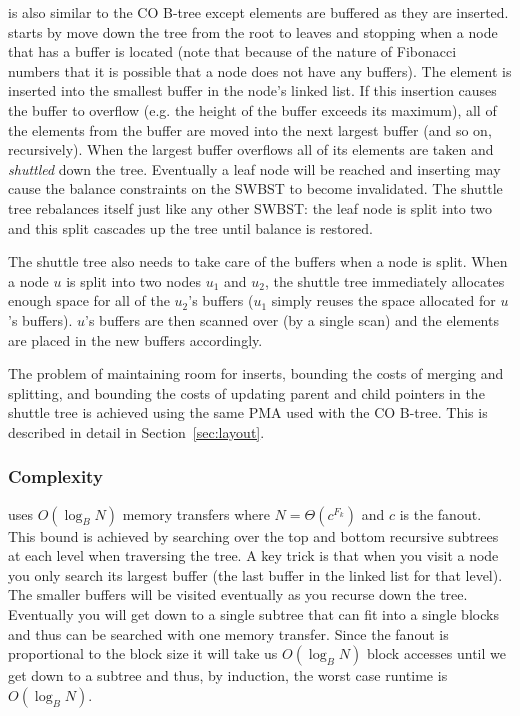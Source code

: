 \documentclass[preprint]{style}
\begin{document}
\Insert{} is also similar to the CO B-tree except elements are buffered as they
are inserted. \Insert{} starts by move down the tree from the root to leaves
and stopping when a node that has a buffer is located (note that because of the
nature of Fibonacci numbers that it is possible that a node does not have any
buffers). The element is inserted into the smallest buffer in the node's linked
list. If this insertion causes the buffer to overflow (e.g. the height of the
buffer exceeds its maximum), all of the elements from the buffer are moved into
the next largest buffer (and so on, recursively).  When the largest buffer
overflows all of its elements are taken and \textit{shuttled} down the tree.
Eventually a leaf node will be reached and inserting may cause the balance
constraints on the SWBST to become invalidated. The shuttle tree rebalances
itself just like any other SWBST: the leaf node is split into two and this
split cascades up the tree until balance is restored.

The shuttle tree also needs to take care of the buffers when a node is split.
When a node $u$ is split into two nodes $u_1$ and $u_2$, the shuttle tree
immediately allocates enough space for all of the $u_2$'s buffers ($u_1$ simply
reuses the space allocated for $u$'s buffers). $u$'s buffers are then scanned
over (by a single scan) and the elements are placed in the new buffers
accordingly.

The problem of maintaining room for inserts, bounding the costs of
merging and splitting, and bounding the costs of updating parent and child
pointers in the shuttle tree is achieved using the same PMA used with the CO
B-tree. This is described in detail in Section~\ref{sec:layout}.

\subsubsection{Complexity}

\Search{} uses $O(\log_{B}{N})$ memory transfers where $N = \Theta(c^{F_k})$ and
$c$ is the fanout. This bound is achieved by searching over the
top and bottom recursive subtrees at each level when traversing the tree. A
key trick is that when you visit a node you only search its largest buffer
(the last buffer in the linked list for that level). The smaller buffers will
be visited eventually as you recurse down the tree. Eventually you will get
down to a single subtree that can fit into a single blocks and thus can be
searched with one memory transfer. Since the fanout is proportional to the
block size it will take us $O(\log_B N)$ block accesses until we get down to a
subtree and thus, by induction, the worst case runtime is $O(\log_B N)$.
\end{document}

